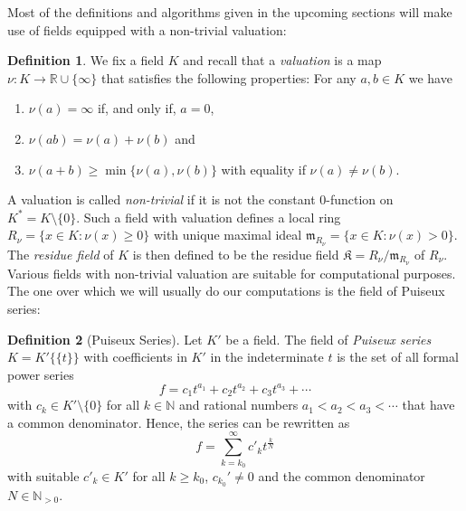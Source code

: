 \documentclass[
  paper=a4,
  titlepage,
  bibliography=totoc,
  pagesize=pdftex
]{scrartcl}
\numberwithin{figure}{section}
\numberwithin{equation}{section}
\numberwithin{table}{section}
\newcommand*\setR{\mathds{R}}
\newcommand*\setN{\mathds{N}}
\newcommand*\puiseux[2]{#1\{\!\{#2\}\!\}}
\theoremstyle{definition}
\newtheorem{definition}{Definition}
\numberwithin{definition}{section}
\begin{document}
Most of the definitions and algorithms given in the upcoming sections will make use of
fields equipped with a non-trivial valuation:

\begin{definition} \label{def:val}
  We fix a field $K$ and recall that a \emph{valuation} is a map $\nu:K\to \setR \cup
  \{\infty\}$ that satisfies the following properties: For any $a, b \in K$ we have
  \begin{enumerate}
    \item $\nu(a) = \infty$ if, and only if, $a=0$,
    \item $\nu(ab) = \nu(a)+\nu(b)$ and
    \item $\nu(a+b) \geq \min\{\nu(a), \nu(b)\}$ with equality if $\nu(a)\neq \nu(b)$.
      \label{def:val:eq}
  \end{enumerate}
\end{definition}

A valuation is called \emph{non-trivial} if it is not the constant 0-function on $K^* =
K\setminus\{0\}$. Such a field with valuation defines a local ring $R_\nu = \{ x \in K :
\nu(x) \geq 0 \}$ with unique maximal ideal $\mathfrak m_{R_\nu} = \{ x \in K : \nu(x) > 0
\}$. The \emph{residue field} of $K$ is then defined to be the residue field $\mathfrak K
= R_\nu/\mathfrak m_{R_\nu}$ of $R_\nu$. Various fields with non-trivial valuation are
suitable for computational purposes. The one over which we will usually do our
computations is the field of Puiseux series:

\begin{definition}[Puiseux Series]
  \label{def:puiseux}
  Let $K'$ be a field. The field of \emph{Puiseux series} $K = \puiseux{K'}{t}$ with
  coefficients in $K'$ in the indeterminate $t$ is the set of all formal power series
  \begin{equation} \label{eq:puiseux1}
    f = c_1 t^{a_1} + c_2 t^{a_2} + c_3 t^{a_3} + \cdots
  \end{equation}
  with $c_k \in K'\setminus\{0\}$ for all $k \in \setN$ and rational numbers $a_1 < a_2 <
  a_3 < \cdots$ that have a common denominator. Hence, the series can be rewritten as
  \begin{equation} \label{eq:puiseux2}
    f = \sum_{k = k_0}^\infty c'_k t^{\frac kN}
  \end{equation}
  with suitable $c'_k \in K'$ for all $k\geq k_0$, $c_{k_0}'\neq0$ and the common
  denominator $N \in \setN_{>0}$.
\end{definition}
\end{document}
